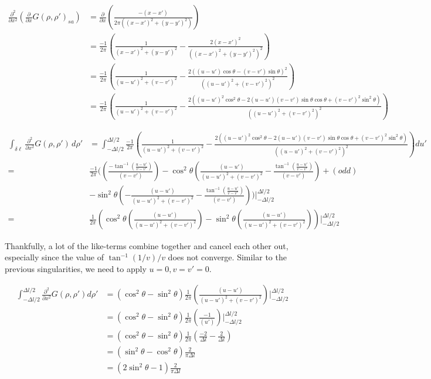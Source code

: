 \documentclass{article}
\newcommand{\0}{\varnothing}
\begin{document}
\begin{align*}
    \frac{\partial^2}{\partial x^2}\left(\frac{\partial}{\partial x} G(\rho, \rho')_{sa}\right) &= \frac{\partial}{\partial x}\left(\frac{-(x-x')}{2\pi((x-x')^2+(y-y')^2)}\right)\\
        &=\frac{-1}{2\pi}\left(\frac{1}{(x-x')^2+(y-y')^2} - \frac{2(x-x')^2}{((x-x')^2+(y-y')^2)^2}\right)\\
    &=\frac{-1}{2\pi}\left(\frac{1}{(u-u')^2+(v-v')^2} - \frac{2((u-u')\cos{\theta} - (v-v')\sin{\theta})^2}{((u-u')^2+(v-v')^2)^2}\right)\\
    &=\frac{-1}{2\pi}\left(\frac{1}{(u-u')^2+(v-v')^2} - \frac{2((u-u')^2\cos^2{\theta} - 2(u-u')(v-v')\sin{\theta}\cos{\theta}+(v-v')^2\sin^2{\theta})}{((u-u')^2+(v-v')^2)^2}\right)
\end{align*}

\begin{align*}
    \int_{\delta\ell}\frac{\partial^2}{\partial x^2}G(\rho,\rho')\, d\rho' &= \int_{-\Delta l/2}^{\Delta l/2}\frac{-1}{2\pi} \left(\frac{1}{(u-u')^2+(v-v')^2} - \frac{2((u-u')^2\cos^2{\theta} - 2(u-u')(v-v')\sin{\theta}\cos{\theta}+(v-v')^2\sin^2{\theta})}{((u-u')^2+(v-v')^2)^2}\right)du'\\
    =&\frac{-1}{2\pi}(\left(\frac{-\tan^{-1}(\frac{u-u'}{v-v'})}{(v-v')}\right) - \cos^2{\theta}\left(\frac{(u-u')}{(u-u')^2 + (v-v')^2} - \frac{\tan^{-1}(\frac{u-u'}{v-v'})}{(v-v')}\right) + (odd)\\
        &-\sin^2{\theta}\left(-\frac{(u-u')}{(u-u')^2 + (v-v')^2} - \frac{\tan^{-1}(\frac{u-u'}{v-v'})}{(v-v')}\right))|_{-\Delta l/2}^{\Delta l/2}\\
    =&\frac{1}{2\pi}\left(\cos^2{\theta}\left(\frac{(u-u')}{(u-u')^2 + (v-v')^2}\right) -\sin^2{\theta}\left(\frac{(u-u')}{(u-u')^2 + (v-v')^2}\right)\right)|_{-\Delta l/2}^{\Delta l/2}
\end{align*}

Thankfully, a lot of the like-terms combine together and cancel each other out, especially since the value of $\tan^{-1}(1/v)/v$ does not converge. Similar to the previous singularities, we need to apply $u=0, v=v'=0$.

\begin{align*}
    \int_{-\Delta l/2}^{\Delta l/2}\frac{\partial^2}{\partial x^2}G(\rho, \rho')d\rho' &= \left(\cos^2\theta - \sin^2\theta\right)\frac{1}{2\pi}\left(\frac{(u-u')}{(u-u')^2 + (v-v')^2}\right)|_{-\Delta l/2}^{\Delta l/2}\\
    &=\left(\cos^2\theta - \sin^2\theta\right)\frac{1}{2\pi}\left(\frac{-1}{(u')}\right)|_{-\Delta l/2}^{\Delta l/2}\\
    &=\left(\cos^2\theta - \sin^2\theta\right)\frac{1}{2\pi}\left(\frac{-2}{\Delta l} - \frac{2}{\Delta l}\right)\\
    &=\left(\sin^2\theta - \cos^2\theta\right)\frac{2}{\pi\Delta l}\\
    &=\left(2\sin^2\theta - 1\right)\frac{2}{\pi\Delta l}\\
\end{align*}
\end{document}

